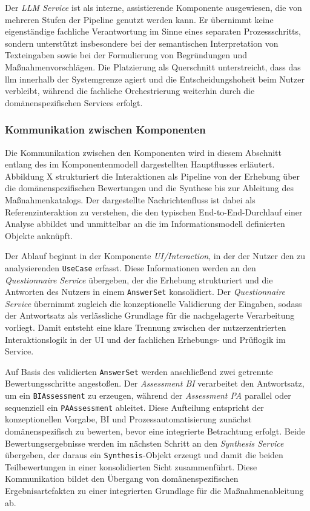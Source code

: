 Der \textit{LLM Service} ist als interne, assistierende Komponente ausgewiesen, die von mehreren Stufen der Pipeline genutzt werden kann. Er übernimmt keine eigenständige fachliche Verantwortung im Sinne eines separaten Prozessschritts, sondern unterstützt insbesondere bei der semantischen Interpretation von Texteingaben sowie bei der Formulierung von Begründungen und Maßnahmenvorschlägen. Die Platzierung als Querschnitt unterstreicht, dass das \gls{llm} innerhalb der Systemgrenze agiert und die Entscheidungshoheit beim Nutzer verbleibt, während die fachliche Orchestrierung weiterhin durch die domänenspezifischen Services erfolgt.


\subsubsection{Kommunikation zwischen Komponenten}
Die Kommunikation zwischen den Komponenten wird in diesem Abschnitt entlang des im Komponentenmodell dargestellten Hauptflusses erläutert. Abbildung X strukturiert die Interaktionen als Pipeline von der Erhebung über die domänenspezifischen Bewertungen und die Synthese bis zur Ableitung des Maßnahmenkatalogs. Der dargestellte Nachrichtenfluss ist dabei als Referenzinteraktion zu verstehen, die den typischen End-to-End-Durchlauf einer Analyse abbildet und unmittelbar an die im Informationsmodell definierten Objekte anknüpft.

Der Ablauf beginnt in der Komponente \textit{UI/Interaction}, in der der Nutzer den zu analysierenden \texttt{UseCase} erfasst. Diese Informationen werden an den \textit{Questionnaire Service} übergeben, der die Erhebung strukturiert und die Antworten des Nutzers in einem \texttt{AnswerSet} konsolidiert. Der \textit{Questionnaire Service} übernimmt zugleich die konzeptionelle Validierung der Eingaben, sodass der Antwortsatz als verlässliche Grundlage für die nachgelagerte Verarbeitung vorliegt. Damit entsteht eine klare Trennung zwischen der nutzerzentrierten Interaktionslogik in der UI und der fachlichen Erhebungs- und Prüflogik im Service.

Auf Basis des validierten \texttt{AnswerSet} werden anschließend zwei getrennte Bewertungsschritte angestoßen. Der \textit{Assessment BI} verarbeitet den Antwortsatz, um ein \texttt{BIAssessment} zu erzeugen, während der \textit{Assessment PA} parallel oder sequenziell ein \texttt{PAAssessment} ableitet. Diese Aufteilung entspricht der konzeptionellen Vorgabe, BI und Prozessautomatisierung zunächst domänenspezifisch zu bewerten, bevor eine integrierte Betrachtung erfolgt. Beide Bewertungsergebnisse werden im nächsten Schritt an den \textit{Synthesis Service} übergeben, der daraus ein \texttt{Synthesis}-Objekt erzeugt und damit die beiden Teilbewertungen in einer konsolidierten Sicht zusammenführt. Diese Kommunikation bildet den Übergang von domänenspezifischen Ergebnisartefakten zu einer integrierten Grundlage für die Maßnahmenableitung ab.

